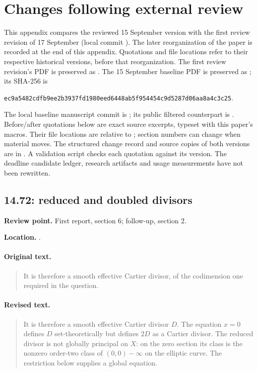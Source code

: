 \section{Changes following external review}
\label{app:review-changes}
This appendix compares the reviewed 15 September version with the
first review revision of 17 September (local commit ).
The later reorganization of the paper is recorded at the end of this
appendix. Quotations and file locations refer to their respective historical
versions, before that reorganization. The first review revision's PDF is
preserved as .
The 15 September baseline PDF is preserved as
; its SHA-256 is
\begin{center}\small
\nolinkurl{ec9a5482cdfb9ee2b3937fd1980eed6448ab5f954454c9d5287d06aa8a4c3c25}.
\end{center}
The local baseline manuscript commit is ; its public
filtered counterpart is .
Before/after quotations below are exact source excerpts, typeset with
this paper's macros. Their file locations are relative to ;
section numbers can change when material moves. The structured change
record and source copies of both versions are in
. A validation script checks
each quotation against its version. The deadline candidate ledger,
research artifacts and usage measurements have not been rewritten.

\subsection{14.72: reduced and doubled divisors}
\noindent\textbf{Review point.} First report, section 6; follow-up, section 2.\par
\noindent\textbf{Location.} .

\paragraph{Original text.}
\begin{quote}\small
It is therefore a smooth effective
Cartier divisor, of the codimension one required in
the question.
\end{quote}

\paragraph{Revised text.}
\begin{quote}\small
It is therefore a smooth effective Cartier divisor \(D\).
The equation \(x=0\) defines \(D\) set-theoretically but defines
\(2D\) as a Cartier divisor. The reduced divisor is not globally
principal on \(X\): on the zero section its class is the nonzero
order-two class of \((0,0)-\infty\) on the elliptic curve.
The restriction below supplies a global equation.
\end{quote}

